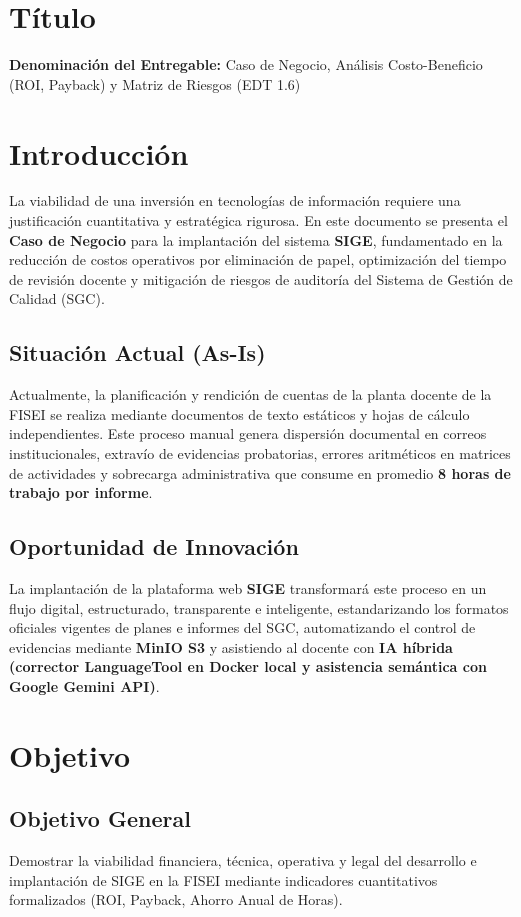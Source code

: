 \documentclass[12pt,a4paper]{article}
\begin{document}
\section{Título}
\textbf{Denominación del Entregable:} Caso de Negocio, Análisis Costo-Beneficio (ROI, Payback) y Matriz de Riesgos (EDT 1.6)



\section{Introducción}
La viabilidad de una inversión en tecnologías de información requiere una justificación cuantitativa y estratégica rigurosa. En este documento se presenta el \textbf{Caso de Negocio} para la implantación del sistema \textbf{SIGE}, fundamentado en la reducción de costos operativos por eliminación de papel, optimización del tiempo de revisión docente y mitigación de riesgos de auditoría del Sistema de Gestión de Calidad (SGC).

\subsection{Situación Actual (As-Is)}
Actualmente, la planificación y rendición de cuentas de la planta docente de la FISEI se realiza mediante documentos de texto estáticos y hojas de cálculo independientes. Este proceso manual genera dispersión documental en correos institucionales, extravío de evidencias probatorias, errores aritméticos en matrices de actividades y sobrecarga administrativa que consume en promedio \textbf{8 horas de trabajo por informe}.

\subsection{Oportunidad de Innovación}
La implantación de la plataforma web \textbf{SIGE} transformará este proceso en un flujo digital, estructurado, transparente e inteligente, estandarizando los formatos oficiales vigentes de planes e informes del SGC, automatizando el control de evidencias mediante \textbf{MinIO S3} y asistiendo al docente con \textbf{IA híbrida (corrector LanguageTool en Docker local y asistencia semántica con Google Gemini API)}.

\section{Objetivo}

\subsection{Objetivo General}
Demostrar la viabilidad financiera, técnica, operativa y legal del desarrollo e implantación de SIGE en la FISEI mediante indicadores cuantitativos formalizados (ROI, Payback, Ahorro Anual de Horas).
\end{document}
